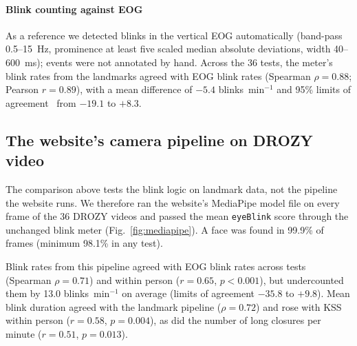 \paragraph*{Blink counting against EOG} As a reference we detected blinks in the vertical EOG automatically (band-pass 0.5--15~Hz, prominence at least five scaled median absolute deviations, width 40--600~ms); events were not annotated by hand. Across the 36 tests, the meter's blink rates from the landmarks agreed with EOG blink rates (Spearman $\rho = 0.88$; Pearson $r = 0.89$), with a mean difference of $-5.4$ blinks~min$^{-1}$ and 95\% limits of agreement~\cite{bland1986statistical} from $-19.1$ to $+8.3$.

\subsection{The website's camera pipeline on DROZY video}
\label{sec:mediapipe}
The comparison above tests the blink logic on landmark data, not the pipeline the website runs. We therefore ran the website's MediaPipe model file on every frame of the 36 DROZY videos and passed the mean \texttt{eyeBlink} score through the unchanged blink meter (Fig.~\ref{fig:mediapipe}). A face was found in 99.9\% of frames (minimum 98.1\% in any test).

Blink rates from this pipeline agreed with EOG blink rates across tests (Spearman $\rho = 0.71$) and within person ($r = 0.65$, $p < 0.001$), but undercounted them by 13.0 blinks~min$^{-1}$ on average (limits of agreement $-35.8$ to $+9.8$). Mean blink duration agreed with the landmark pipeline ($\rho = 0.72$) and rose with KSS within person ($r = 0.58$, $p = 0.004$), as did the number of long closures per minute ($r = 0.51$, $p = 0.013$).

